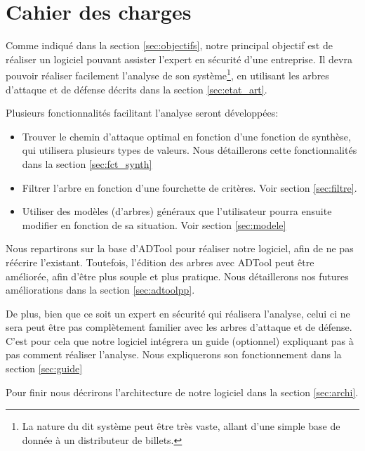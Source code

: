 \section{Cahier des charges}
    \label{sec:cahier}


    Comme indiqué dans la section \ref{sec:objectifs}, notre principal objectif est de réaliser un logiciel pouvant assister l'expert en sécurité d'une entreprise. Il devra pouvoir réaliser facilement l'analyse de son système\footnote{La nature du dit système peut être très vaste, allant d'une simple base de donnée à un distributeur de billets.}, en utilisant les arbres d'attaque et de défense décrits dans la section \ref{sec:etat_art}.

    Plusieurs fonctionnalités facilitant l'analyse seront développées:
    \begin{itemize}
        \item Trouver le chemin d'attaque optimal en fonction d'une fonction de synthèse, qui utilisera plusieurs types de valeurs. Nous détaillerons cette fonctionnalités dans la section \ref{sec:fct_synth}
        \item Filtrer l'arbre en fonction d'une fourchette de critères. Voir section \ref{sec:filtre}.
        \item Utiliser des modèles (d'arbres) généraux que l'utilisateur pourra ensuite modifier en fonction de sa situation. Voir section \ref{sec:modele}
    \end{itemize}

    Nous repartirons sur la base d'ADTool pour réaliser notre logiciel, afin de ne pas réécrire l'existant. Toutefois, l'édition des arbres avec ADTool peut être améliorée, afin d'être plus souple et plus pratique. Nous détaillerons nos futures améliorations dans la section \ref{sec:adtoolpp}.

    De plus, bien que ce soit un expert en sécurité qui réalisera l'analyse, celui ci ne sera peut être pas complètement familier avec les arbres d'attaque et de défense. C'est pour cela que notre logiciel intégrera un guide (optionnel) expliquant pas à pas comment réaliser l'analyse. Nous expliquerons son fonctionnement dans la section \ref{sec:guide}

    Pour finir nous décrirons l'architecture de notre logiciel dans la section \ref{sec:archi}.


